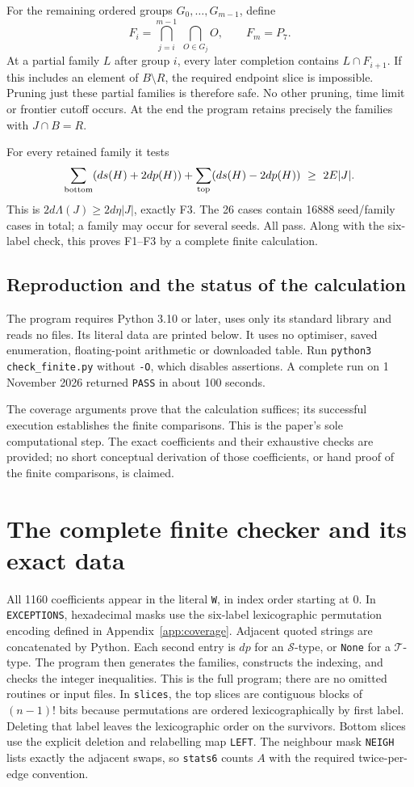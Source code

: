 \documentclass[11pt,letterpaper]{article}
\theoremstyle{definition}
\begin{document}
For the remaining ordered groups \(G_0,\ldots,G_{m-1}\), define
\[
 F_i=\bigcap_{j=i}^{m-1}\ \bigcap_{O\in G_j}O,
 \qquad F_m=P_7.
\]
At a partial family \(L\) after group \(i\), every later completion
contains \(L\cap F_{i+1}\). If this includes an element of
\(B\setminus R\), the required endpoint slice is impossible.
Pruning just these partial families is therefore safe. No other
pruning, time limit or frontier cutoff occurs. At the end the program
retains precisely the families with \(J\cap B=R\).

For every retained family it tests
\[
 \sum_{\rm bottom}(ds(H)+2dp(H))+
 \sum_{\rm top}(ds(H)-2dp(H))\ \geq\ 2E|J|.
\]
This is \(2d\Lambda(J)\geq2d\eta|J|\), exactly F3.
The 26 cases contain 16888 seed/family cases in total; a family may
occur for several seeds. All pass. Along with the six-label check,
this proves F1--F3 by a complete finite calculation.

\subsection{Reproduction and the status of the calculation}
The program requires Python 3.10 or later, uses only its standard
library and reads no files. Its literal data are printed below.
It uses no optimiser, saved enumeration, floating-point arithmetic
or downloaded table. Run \texttt{python3 check\_finite.py} without
\texttt{-O}, which disables assertions. A complete run on 1 November
2026 returned \texttt{PASS} in about 100 seconds.

The coverage arguments prove that the calculation suffices; its
successful execution establishes the finite comparisons. This is the
paper's sole computational step. The exact coefficients and their
exhaustive checks are provided; no short conceptual derivation of
those coefficients, or hand proof of the finite comparisons, is claimed.

\clearpage
\section{The complete finite checker and its exact data}\label{app:checker}
All 1160 coefficients appear in the literal \texttt{W}, in index order
starting at 0. In \texttt{EXCEPTIONS}, hexadecimal masks use the six-label
lexicographic permutation encoding defined in Appendix~\ref{app:coverage}.
Adjacent quoted strings are concatenated by Python. Each second entry
is \(dp\) for an \(\mathcal S\)-type, or \texttt{None} for a
\(\mathcal T\)-type. The program then generates the families, constructs
the indexing, and checks the integer inequalities. This is the full
program; there are no omitted routines or input files.
In \texttt{slices}, the top slices are contiguous blocks of
\((n-1)!\) bits because permutations are ordered lexicographically
by first label. Deleting that label leaves the lexicographic order on
the survivors. Bottom slices use the explicit deletion and relabelling
map \texttt{LEFT}. The neighbour mask \texttt{NEIGH} lists exactly
the adjacent swaps, so \texttt{stats6} counts \(A\) with the required
twice-per-edge convention.

\end{document}
